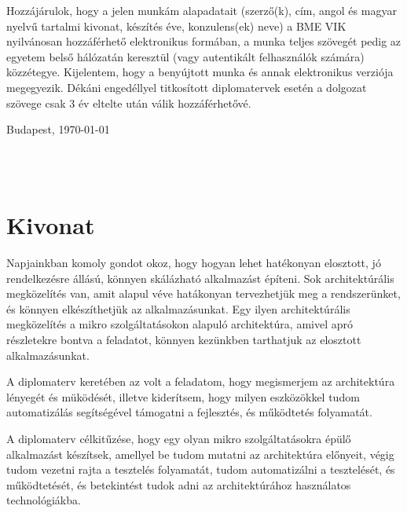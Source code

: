\documentclass[11pt,magyar,a4paper,oneside,]{report}
\begin{document}
Hozzájárulok, hogy a jelen munkám alapadatait (szerző(k), cím, angol és magyar nyelvű tartalmi kivonat, készítés éve, konzulens(ek) neve) a BME VIK nyilvánosan hozzáférhető elektronikus formában, a munka teljes szövegét pedig az egyetem belső hálózatán keresztül (vagy autentikált felhasználók számára) közzétegye. Kijelentem, hogy a benyújtott munka és annak elektronikus verziója megegyezik. Dékáni engedéllyel titkosított diplomatervek esetén a dolgozat szövege csak 3 év eltelte után válik hozzáférhetővé.

\begin{flushleft}
\vspace*{1cm}
Budapest, \today
\end{flushleft}

\begin{flushright}
 \vspace*{1cm}
 \makebox[7cm]{\rule{6cm}{.4pt}}\\
 \\
\end{flushright}
\thispagestyle{empty}

\vfill
\clearpage
\thispagestyle{empty} %

\chapter*{Kivonat}\label{kivonat}

Napjainkban komoly gondot okoz, hogy hogyan lehet hatékonyan elosztott,
jó rendelkezésre állású, könnyen skálázható alkalmazást építeni. Sok
architektúrális megközelítés van, amit alapul véve hatákonyan
tervezhetjük meg a rendszerünket, és könnyen elkészíthetjük az
alkalmazásunkat. Egy ilyen architektúrális megközelítés a mikro
szolgáltatásokon alapuló architektúra, amivel apró részletekre bontva a
feladatot, könnyen kezünkben tarthatjuk az elosztott alkalmazásunkat.

A diplomaterv keretében az volt a feladatom, hogy megismerjem az
architektúra lényegét és müködését, illetve kiderítsem, hogy milyen
eszközökkel tudom automatizálás segítségével támogatni a fejlesztés, és
működtetés folyamatát.

A diplomaterv célkitűzése, hogy egy olyan mikro szolgáltatásokra épülő
alkalmazást készítsek, amellyel be tudom mutatni az architektúra
előnyeit, végig tudom vezetni rajta a tesztelés folyamatát, tudom
automatizálni a tesztelését, és működtetését, és betekintést tudok adni
az architektúrához használatos technológiákba.
\end{document}
